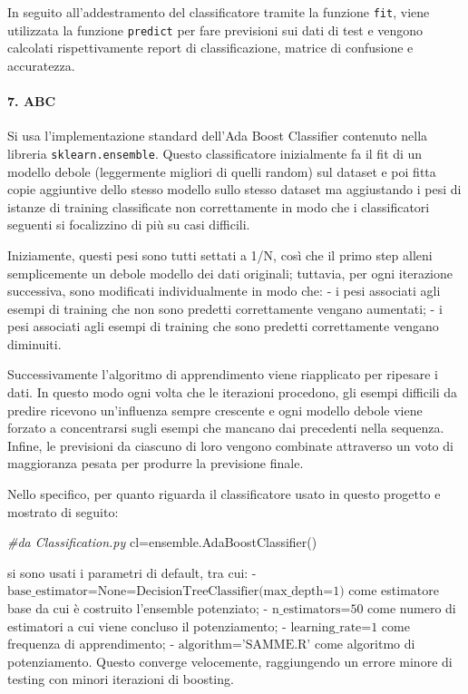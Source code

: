 \documentclass[11pt]{article}
\newenvironment{Shaded}{}{}
\newcommand{\CommentTok}[1]{\textcolor[rgb]{0.38,0.63,0.69}{\textit{{#1}}}}
\newcommand{\NormalTok}[1]{{#1}}
\newcommand{\OperatorTok}[1]{\textcolor[rgb]{0.40,0.40,0.40}{{#1}}}
\begin{document}
In seguito all'addestramento del classificatore tramite la funzione
\texttt{fit}, viene utilizzata la funzione \texttt{predict} per fare
previsioni sui dati di test e vengono calcolati rispettivamente report
di classificazione, matrice di confusione e accuratezza.

    \paragraph{7. ABC}\label{abc}

    Si usa l'implementazione standard dell'Ada Boost Classifier contenuto
nella libreria \texttt{sklearn.ensemble}. Questo classificatore
inizialmente fa il fit di un modello debole (leggermente migliori di
quelli random) sul dataset e poi fitta copie aggiuntive dello stesso
modello sullo stesso dataset ma aggiustando i pesi di istanze di
training classificate non correttamente in modo che i classificatori
seguenti si focalizzino di più su casi difficili.

Iniziamente, questi pesi sono tutti settati a 1/N, così che il primo
step alleni semplicemente un debole modello dei dati originali;
tuttavia, per ogni iterazione successiva, sono modificati
individualmente in modo che: - i pesi associati agli esempi di training
che non sono predetti correttamente vengano aumentati; - i pesi
associati agli esempi di training che sono predetti correttamente
vengano diminuiti.

Successivamente l'algoritmo di apprendimento viene riapplicato per
ripesare i dati. In questo modo ogni volta che le iterazioni procedono,
gli esempi difficili da predire ricevono un'influenza sempre crescente e
ogni modello debole viene forzato a concentrarsi sugli esempi che
mancano dai precedenti nella sequenza. Infine, le previsioni da ciascuno
di loro vengono combinate attraverso un voto di maggioranza pesata per
produrre la previsione finale.

Nello specifico, per quanto riguarda il classificatore usato in questo
progetto e mostrato di seguito:

\begin{Shaded}
\begin{Highlighting}[]
\CommentTok{#da Classification.py}
\NormalTok{cl}\OperatorTok{=}\NormalTok{ensemble.AdaBoostClassifier()       }
\end{Highlighting}
\end{Shaded}

si sono usati i parametri di default, tra cui: -
\(\text{base_estimator=None=DecisionTreeClassifier(max_depth=1)}\) come
estimatore base da cui è costruito l'ensemble potenziato; -
\(\text{n_estimators=50}\) come numero di estimatori a cui viene
concluso il potenziamento; - \(\text{learning_rate=1}\) come frequenza
di apprendimento; - \(\text{algorithm='SAMME.R'}\) come algoritmo di
potenziamento. Questo converge velocemente, raggiungendo un errore
minore di testing con minori iterazioni di boosting.
\end{document}
